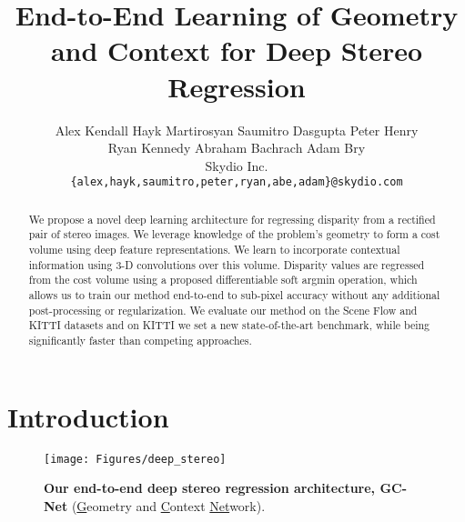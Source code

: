 \documentclass[10pt,twocolumn,letterpaper]{article}
\begin{document}
\title{End-to-End Learning of Geometry and Context for Deep Stereo Regression}


\author{Alex Kendall \qquad Hayk Martirosyan \qquad Saumitro Dasgupta \qquad Peter Henry\\
Ryan Kennedy \qquad Abraham Bachrach \qquad Adam Bry\vspace{0.5em}\\
\large Skydio Inc.\\
\normalsize
\texttt{\{alex,hayk,saumitro,peter,ryan,abe,adam\}@skydio.com}
}

\newcommand{\fig}[1]{Figure~\ref{fig:#1}}
\newcommand{\tbl}[1]{Table~\ref{tbl:#1}}

\maketitle


\begin{abstract}

We propose a novel deep learning architecture for regressing disparity from a rectified pair of stereo images. We leverage knowledge of the problem's geometry to form a cost volume using deep feature representations. We learn to incorporate contextual information using {3-D} convolutions over this volume. 
Disparity values are regressed from the cost volume using a proposed differentiable soft argmin operation, which allows us to train our method end-to-end to sub-pixel accuracy without any additional post-processing or regularization. We evaluate our method on the Scene Flow and KITTI datasets and on KITTI we set a new state-of-the-art benchmark, while being significantly faster than competing approaches.

\end{abstract}

\section{Introduction}

\begin{figure*}[t]
	\begin{center}
		\texttt{[image: Figures/deep\_stereo]}
	\end{center}
	\caption{\textbf{Our end-to-end deep stereo regression architecture, GC-Net} (\underline{G}eometry and \underline{C}ontext \underline{Net}work).}
	\label{fig:model}
\end{figure*}
\end{document}
